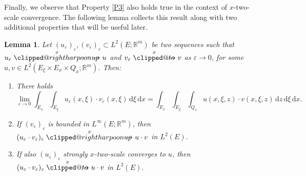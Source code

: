 \documentclass[reqno,11pt]{amsart}
\makeatletter
\numberwithin{equation}{section}
\theoremstyle{thmlemcorr}
\numberwithin{theorem}{section}
\newtheorem{lemma}[theorem]{Lemma}
\theoremstyle{thmlemcorr*}
\theoremstyle{defi}
\theoremstyle{remexample}
\theoremstyle{ass}
\newcommand{\R}{\mathbb{R}}
\renewcommand{\epsilon}{\varepsilon}
\newcommand{\1}{\mathds{1}}
\DeclareRobustCommand{\wtwoscale}{%
  \clippedrightharpoonup\mathrel{\mspace{-15mu}}\rightharpoonup
}
\newcommand{\clippedrightharpoonup}{%
  \mathrel{\mathpalette\clipped@rightharpoonup\relax}%
}
\newcommand{\clipped@rightharpoonup}[2]{%
  \sbox\z@{$\m@th#1\mspace{6mu}$}%
  \clipbox{0pt 0pt {\dimexpr\width-.5\wd\z@} 0pt}{$\m@th#1\rightharpoonup$}%
  \smash{\clipbox{{\wd\z@} 0pt 0pt {-\width}}{$\m@th#1\rightharpoonup$}}%
}
\DeclareRobustCommand{\twoscale}{%
  \clippedto\mathrel{\mspace{-15mu}}\to
}
\newcommand{\clippedto}{%
  \mathrel{\mathpalette\clipped@to\relax}%
}
\newcommand{\clipped@to}[2]{%
  \sbox\z@{$\m@th#1\mspace{6mu}$}%
  \clipbox{0pt 0pt {\dimexpr\width-.5\wd\z@} 0pt}{$\m@th#1\to$}%
  \smash{\clipbox{{\wd\z@} 0pt 0pt {-\width}}{$\m@th#1\to$}}%
}
\newcommand{\xtwoscale}{\overset{x}{\twoscale}}
\newcommand{\wxtwoscale}{\overset{x}{\wtwoscale}}
\newcommand{\veps}{\varepsilon}
\newcommand{\dl}{\,\mathrm{d}}
\newcommand{\sequence}[2]{(#1_#2)_{#2}}
\makeatother
\begin{document}
Finally, we observe that Property \ref{P3} also holds true in the context of \(x\)-two-scale convergence. The following lemma collects this result along with two additional properties that will be useful later.
\begin{lemma}\label{lem:xts_products}
    Let \(\sequence{u}{\veps},\sequence{v}{\veps}\subset L^2(E;\R^m)\) be two sequences such that $u_\veps \wxtwoscale u$ and $v_\veps \xtwoscale v$ as $\veps \to 0$, for some \(u,v\in L^2(E_\xi\times E_x\times Q_x;\R^m)\). Then:
    \begin{enumerate}[label=(\roman*)]
        \item \label{xts_products-i)}
            There holds
            \begin{equation}\label{eq:xts_products}
            \lim_{\veps\to 0}\int_{E_x}\int_{E_\xi} u_\veps(x,\xi) \cdot v_\veps(x,\xi)\dl \xi\dl x
                 =\int_{E_x}\int_{E_\xi}\int_{Q_x} u(x,\xi,z)\cdot v(x,\xi,z)\dl z\dl \xi\dl x.
            \end{equation}
        \item \label{xts_products-ii)}
            If $(v_\epsilon)_\epsilon$ is bounded in $L^{\infty}(E;\R^m)$, then $(u_\epsilon \cdot v_\epsilon)_\epsilon \wxtwoscale u \cdot v$ in \(L^2(E)\).
        \item \label{xts_products-iii)}
            If also \(\sequence{u}{\veps}\) strongly \(x\)-two-scale converges to \(u\), then $(u_\epsilon \cdot v_\epsilon)_\epsilon \xtwoscale u \cdot v$ in \(L^2(E)\).
    \end{enumerate}

\end{lemma}
\end{document}
